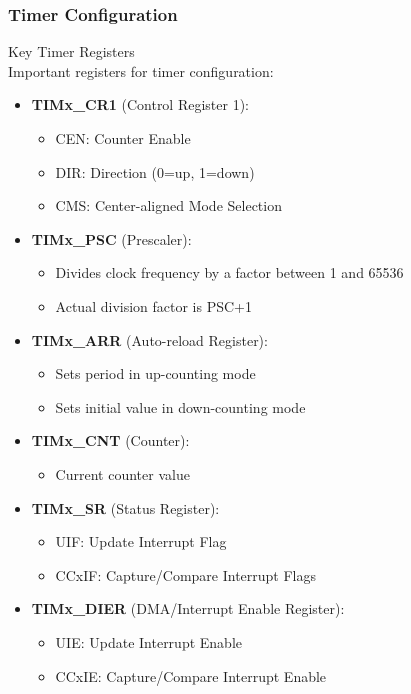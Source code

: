 \subsubsection{Timer Configuration}

\begin{definition}{Key Timer Registers}\\
Important registers for timer configuration:
\begin{itemize}
    \item \textbf{TIMx\_CR1} (Control Register 1):
    \begin{itemize}
        \item CEN: Counter Enable
        \item DIR: Direction (0=up, 1=down)
        \item CMS: Center-aligned Mode Selection
    \end{itemize}
    \item \textbf{TIMx\_PSC} (Prescaler):
    \begin{itemize}
        \item Divides clock frequency by a factor between 1 and 65536
        \item Actual division factor is PSC+1
    \end{itemize}
    \item \textbf{TIMx\_ARR} (Auto-reload Register):
    \begin{itemize}
        \item Sets period in up-counting mode
        \item Sets initial value in down-counting mode
    \end{itemize}
    \item \textbf{TIMx\_CNT} (Counter):
    \begin{itemize}
        \item Current counter value
    \end{itemize}
    \item \textbf{TIMx\_SR} (Status Register):
    \begin{itemize}
        \item UIF: Update Interrupt Flag
        \item CCxIF: Capture/Compare Interrupt Flags
    \end{itemize}
    \item \textbf{TIMx\_DIER} (DMA/Interrupt Enable Register):
    \begin{itemize}
        \item UIE: Update Interrupt Enable
        \item CCxIE: Capture/Compare Interrupt Enable
    \end{itemize}
\end{itemize}
\end{definition}

